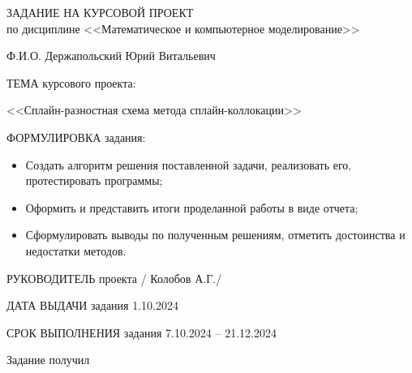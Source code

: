 \begin{center}
    ЗАДАНИЕ НА КУРСОВОЙ ПРОЕКТ\\
    по дисциплине <<Математическое и компьютерное моделирование>>
\end{center}
    
Ф.И.О. Держапольский Юрий Витальевич

\vspace*{10pt}

ТЕМА курсового проекта:

<<Сплайн-разностная схема метода сплайн-коллокации>>

\vspace*{10pt}

ФОРМУЛИРОВКА задания:
\begin{itemize}
    \item Создать алгоритм решения поставленной задачи, реализовать его, протестировать программы;
    \item Оформить и представить итоги проделанной работы в виде отчета;
    \item Сформулировать выводы по полученным решениям, отметить достоинства и недостатки методов.
\end{itemize}

РУКОВОДИТЕЛЬ проекта \underline{\hspace{100pt}} / Колобов А.Г./

ДАТА ВЫДАЧИ задания 1.10.2024

СРОК ВЫПОЛНЕНИЯ задания 7.10.2024 – 21.12.2024

Задание получил \underline{\hspace{200pt}}

\thispagestyle{empty}